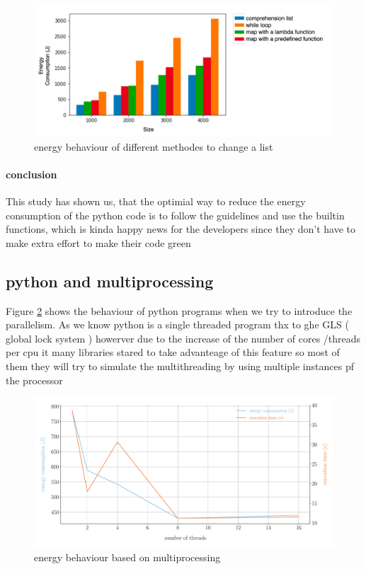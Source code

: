 \begin{figure}
    \centering
    \includegraphics[width=\linewidth]{imgs/python_treatemens}
    \caption{energy behaviour of different methodes to change a list}
    \label{fig:pythontreatement}
\end{figure}

\paragraph{conclusion}
This study has shown us, that the optimial way to reduce the energy consumption of the python code is to follow the guidelines and use the builtin functions, which is kinda happy news for the developers since they don't have to make extra effort to make their code green


\subsection{python and multiprocessing}
Figure \ref{fig:python_multiprocessing} shows the behaviour of python programs when we try to introduce the parallelism.
As we know python is a single threaded program thx to ghe GLS ( global lock system ) howerver due to the increase of the number of cores /threads per cpu it many libraries stared to take advanteage of this feature so most of them they will try to simulate the multithreading by using multiple instances pf the processor %

\begin{figure}[hbt]
    \centering
    \includegraphics[width=\linewidth]{imgs/multiprocessing_energyvstime}
    \caption{energy behaviour based on multiprocessing}
    \label{fig:python_multiprocessing}
\end{figure}

